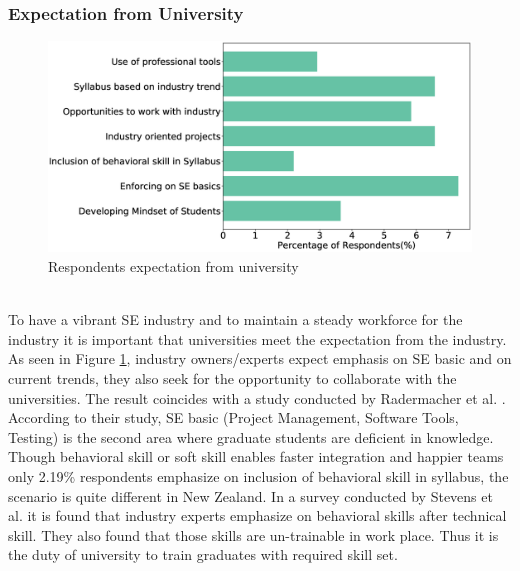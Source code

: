 \subsubsection{Expectation from University}

\label{Expectation from University}
\begin{figure}[htbp]
\includegraphics[scale=0.28]{Figures/UniversityExpectation.eps} 
\caption{Respondents expectation from university}
\label{fig:university expectation}
\end{figure}
\hfill\\
To have a vibrant SE industry and to maintain a steady workforce for the industry it is important that universities meet the expectation from the industry. As seen in Figure \ref{fig:university expectation}, industry owners/experts expect emphasis on SE basic and on current trends, they also seek for the opportunity to collaborate with the universities. The result coincides with  a study conducted by Radermacher et al. \cite{Radermacher2013}. According to their study, SE basic (Project Management, Software Tools, Testing) is the second area where graduate students are deficient in knowledge\cite{Radermacher2013}. Though behavioral skill or soft skill enables faster integration and happier teams only 2.19\% respondents emphasize on inclusion of behavioral skill in syllabus, the scenario is quite different in New Zealand. In a survey conducted by Stevens et al.\cite{Stevens2016} it is found that industry experts emphasize on behavioral skills after technical skill. They also found that those skills are un-trainable in work place. Thus it is the duty of university to train graduates with required skill set.
